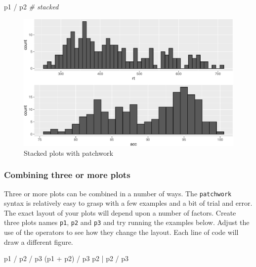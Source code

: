 \documentclass[
  english,
  doc,floatsintext]{apa6}
\newenvironment{Shaded}{\begin{snugshade}}{\end{snugshade}}
\newcommand{\CommentTok}[1]{\textcolor[rgb]{0.56,0.35,0.01}{\textit{#1}}}
\newcommand{\NormalTok}[1]{#1}
\newcommand{\SpecialCharTok}[1]{\textcolor[rgb]{0.00,0.00,0.00}{#1}}
\begin{document}
\begin{Shaded}
\begin{Highlighting}[]
\NormalTok{p1 }\SpecialCharTok{/}\NormalTok{ p2 }\CommentTok{\# stacked}
\end{Highlighting}
\end{Shaded}

\begin{figure}

{\centering \includegraphics[width=1\linewidth]{images/patchwork-stack-1} 

}

\caption{Stacked plots with patchwork}\label{fig:patchwork-stack}
\end{figure}

\hypertarget{combining-three-or-more-plots}{%
\subsubsection{Combining three or more plots}\label{combining-three-or-more-plots}}

Three or more plots can be combined in a number of ways. The \texttt{patchwork} syntax is relatively easy to grasp with a few examples and a bit of trial and error. The exact layout of your plots will depend upon a number of factors. Create three plots names \texttt{p1}, \texttt{p2} and \texttt{p3} and try running the examples below. Adjust the use of the operators to see how they change the layout. Each line of code will draw a different figure.

\begin{Shaded}
\begin{Highlighting}[]
\NormalTok{p1 }\SpecialCharTok{/}\NormalTok{ p2 }\SpecialCharTok{/}\NormalTok{ p3}
\NormalTok{(p1 }\SpecialCharTok{+}\NormalTok{ p2) }\SpecialCharTok{/}\NormalTok{ p3}
\NormalTok{p2 }\SpecialCharTok{|}\NormalTok{ p2 }\SpecialCharTok{/}\NormalTok{ p3}
\end{Highlighting}
\end{Shaded}
\end{document}
